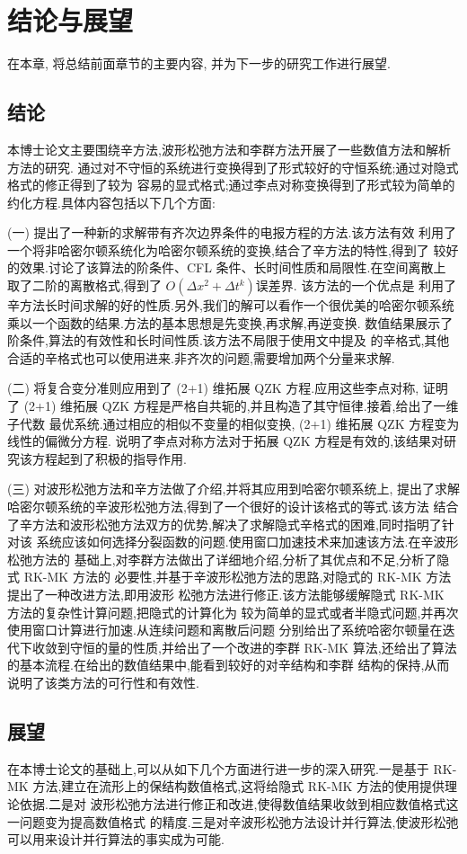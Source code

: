 \chapter{结论与展望}
在本章, 将总结前面章节的主要内容, 并为下一步的研究工作进行展望.
\section{结论}
本博士论文主要围绕辛方法,波形松弛方法和李群方法开展了一些数值方法和解析方法的研究.
通过对不守恒的系统进行变换得到了形式较好的守恒系统;通过对隐式格式的修正得到了较为
容易的显式格式;通过李点对称变换得到了形式较为简单的约化方程.具体内容包括以下几个方面:

(一) 提出了一种新的求解带有齐次边界条件的电报方程的方法.该方法有效
利用了一个将非哈密尔顿系统化为哈密尔顿系统的变换,结合了辛方法的特性,得到了
较好的效果.讨论了该算法的阶条件、CFL 条件、长时间性质和局限性.在空间离散上
取了二阶的离散格式,得到了 \texorpdfstring{$O(\Delta x^2+ \Delta t^k)$} 的误差界. 该方法的一个优点是
利用了辛方法长时间求解的好的性质.另外,我们的解可以看作一个很优美的哈密尔顿系统
乘以一个函数的结果.方法的基本思想是先变换,再求解,再逆变换.
数值结果展示了阶条件,算法的有效性和长时间性质.该方法不局限于使用文中提及
的辛格式,其他合适的辛格式也可以使用进来.非齐次的问题,需要增加两个分量来求解.

(二) 将复合变分准则应用到了 (2+1) 维拓展 QZK 方程.应用这些李点对称,
证明了 (2+1) 维拓展 QZK 方程是严格自共轭的,并且构造了其守恒律.接着,给出了一维子代数
最优系统.通过相应的相似不变量的相似变换, (2+1) 维拓展 QZK 方程变为线性的偏微分方程.
说明了李点对称方法对于拓展 QZK 方程是有效的,该结果对研究该方程起到了积极的指导作用.

(三) 对波形松弛方法和辛方法做了介绍,并将其应用到哈密尔顿系统上,
提出了求解哈密尔顿系统的辛波形松弛方法,得到了一个很好的设计该格式的等式.该方法
结合了辛方法和波形松弛方法双方的优势,解决了求解隐式辛格式的困难,同时指明了针对该
系统应该如何选择分裂函数的问题.使用窗口加速技术来加速该方法.在辛波形松弛方法的
基础上,对李群方法做出了详细地介绍,分析了其优点和不足,分析了隐式 RK-MK 方法的
必要性,并基于辛波形松弛方法的思路,对隐式的 RK-MK 方法提出了一种改进方法,即用波形
松弛方法进行修正.该方法能够缓解隐式 RK-MK 方法的复杂性计算问题,把隐式的计算化为
较为简单的显式或者半隐式问题,并再次使用窗口计算进行加速.从连续问题和离散后问题
分别给出了系统哈密尔顿量在迭代下收敛到守恒的量的性质,并给出了一个改进的李群 RK-MK
算法,还给出了算法的基本流程.在给出的数值结果中,能看到较好的对辛结构和李群
结构的保持,从而说明了该类方法的可行性和有效性.

\section{展望}
在本博士论文的基础上,可以从如下几个方面进行进一步的深入研究.一是基于 RK-MK
方法,建立在流形上的保结构数值格式,这将给隐式 RK-MK 方法的使用提供理论依据.二是对
波形松弛方法进行修正和改进,使得数值结果收敛到相应数值格式这一问题变为提高数值格式
的精度.三是对辛波形松弛方法设计并行算法,使波形松弛可以用来设计并行算法的事实成为可能.
